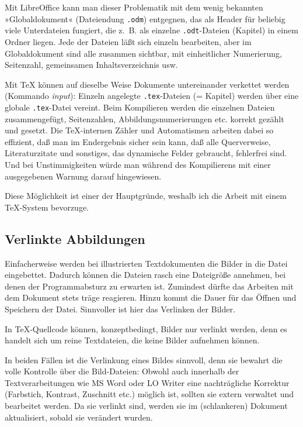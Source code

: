 \documentclass[11pt,a4paper,ngerman,DIV=8]{scrartcl}
\begin{document}
Mit LibreOffice kann man dieser Problematik mit dem wenig bekannten »Globaldokument« (Dateiendung \texttt{.odm}) entgegnen, das als Header für beliebig viele Unterdateien fungiert, die z.~B. als einzelne \texttt{.odt}-Dateien (Kapitel) in einem Ordner liegen. Jede der Dateien läßt sich einzeln bearbeiten, aber im Globaldokument sind alle zusammen sichtbar, mit einheitlicher Numerierung, Seitenzahl, gemeinsamen Inhaltsverzeichnis usw.

Mit \TeX{} können auf dieselbe Weise Dokumente untereinander verkettet werden (Kommando \emph{input}): Einzeln angelegte \texttt{.tex}-Dateien (= Kapitel) werden über eine globale \texttt{.tex}-Datei vereint. Beim Kompilieren werden die einzelnen Dateien zusammengefügt, Seitenzahlen, Abbildungsnumerierungen etc. korrekt gezählt und gesetzt. Die \TeX{}-internen Zähler und Automatismen arbeiten dabei so effizient, daß man im Endergebnis sicher sein kann, daß alle Querverweise, Literaturzitate und sonstiges, das dynamische Felder gebraucht, fehlerfrei sind. Und bei Unstimmigkeiten würde man während des Kompilierens mit einer ausgegebenen Warnung darauf hingewiesen.

Diese Möglichkeit ist einer der Hauptgründe, weshalb ich die Arbeit mit einem \TeX{}-System bevorzuge.

\subsection{Verlinkte Abbildungen}

Einfacherweise werden bei illustrierten Textdokumenten die Bilder in die Datei eingebettet. Dadurch können die Dateien rasch eine Dateigröße annehmen, bei denen der Programmabsturz zu erwarten ist. Zumindest dürfte das Arbeiten mit dem Dokument stets träge reagieren. Hinzu kommt die Dauer für das Öffnen und Speichern der Datei. Sinnvoller ist hier das Verlinken der Bilder.

In \TeX{}-Quellcode können, konzeptbedingt, Bilder nur verlinkt werden, denn es handelt sich um reine Textdateien, die keine Bilder aufnehmen können.

In beiden Fällen ist die Verlinkung eines Bildes sinnvoll, denn sie bewahrt die volle Kontrolle über die Bild-Dateien: Obwohl auch innerhalb der Textverarbeitungen wie MS Word oder LO Writer eine nachträgliche Korrektur (Farbstich, Kontrast, Zuschnitt etc.) möglich ist, sollten sie extern verwaltet und bearbeitet werden. Da sie verlinkt sind, werden sie im (schlankeren) Dokument aktualisiert, sobald sie verändert wurden.
\end{document}
